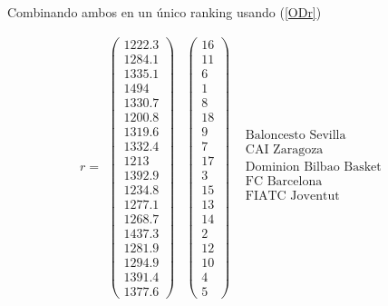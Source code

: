 	Combinando ambos en un único ranking usando (\ref{ODr})
	
		\[r=
		\begin{array}{ccc}
		\left(\begin{array}{c}
		    1222.3\\
		    1284.1\\
		    1335.1\\
		    1494\\
		    1330.7\\
		    1200.8\\
		    1319.6\\
		    1332.4\\
		    1213\\
		    1392.9\\
		    1234.8\\
		    1277.1\\
		    1268.7\\
		    1437.3\\
		    1281.9\\
		    1294.9\\
		    1391.4\\
		    1377.6
		\end{array} \right) & \left(\begin{array}{c}
		    16\\
		    11\\
		    6\\
		    1\\
		    8\\
		    18\\
		    9\\
		    7\\
		    17\\
		    3\\
		    15\\
		    13\\
		    14\\
		    2\\
		    12\\
		    10\\
		    4\\
		    5
		\end{array} \right) & \begin{array}{c}
		\text{Baloncesto Sevilla}\\
		\text{CAI Zaragoza} \\
		\text{Dominion Bilbao Basket} \\
		\text{FC Barcelona} \\
		\text{FIATC Joventut} \\

\end{array}
\end{array}\]
